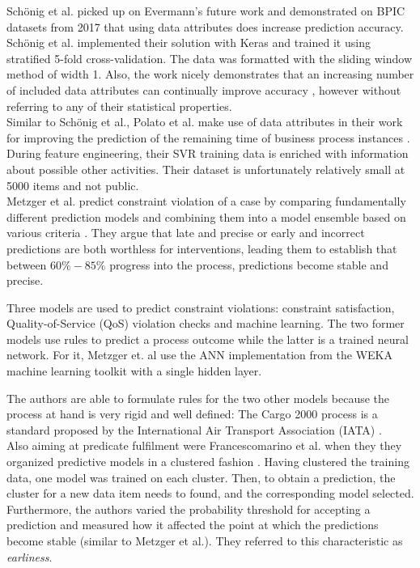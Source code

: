 Schönig et al. \cite{schoenig2018} picked up on Evermann's future work and demonstrated on BPIC datasets from 2017 that using data attributes does increase prediction accuracy. Schönig et al. implemented their solution with Keras and trained it using stratified 5-fold cross-validation. The data was formatted with the sliding window method of width 1. Also, the work nicely demonstrates that an increasing number of included data attributes can continually improve accuracy \cite[p.5]{schoenig2018}, however without referring to any of their statistical properties.\\

Similar to Schönig et al., Polato et al. make use of data attributes in their work for improving the prediction of the remaining time of business process instances \cite{polato2014}. During feature engineering, their SVR training data is enriched with information about possible other activities. Their dataset is unfortunately relatively small at 5000 items and not public.\\

Metzger et al. predict constraint violation of a case by comparing fundamentally different prediction models and combining them into a model ensemble based on various criteria \cite{metzger2015}. They argue that late and precise or early and incorrect predictions are both worthless for interventions, leading them to establish that between $60\% - 85\%$ progress into the process, predictions become stable and precise.

Three models are used to predict constraint violations: constraint satisfaction, Quality-of-Service (QoS) violation checks and machine learning. The two former models use rules to predict a process outcome while the latter is a trained neural network. For it, Metzger et. al use the ANN implementation from the WEKA machine learning toolkit with a single hidden layer. 

The authors are able to formulate rules for the two other models because the process at hand is very rigid and well defined: The Cargo 2000 process is a standard proposed by the International Air Transport Association (IATA) \cite{metzger2015}.\\

Also aiming at predicate fulfilment were Francescomarino et al. when they they organized predictive models in a clustered fashion \cite{francescomarino2015}. Having clustered the training data, one model was trained on each cluster. Then, to obtain a prediction, the cluster for a new data item needs to found, and the corresponding model selected. Furthermore, the authors varied the probability threshold for accepting a prediction and measured how it affected the point at which the predictions become stable (similar to Metzger et al.). They referred to this characteristic as \textit{earliness}.

